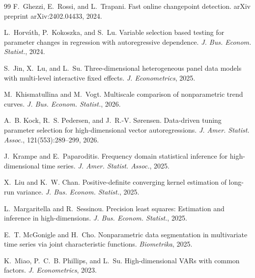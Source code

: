 \documentclass[12pt]{article}
\begin{document}
{\begin{thebibliography}{99}
F.~Ghezzi, E.~Rossi, and L.~Trapani.
\newblock Fast online changepoint detection.
\newblock arXiv preprint arXiv:2402.04433, 2024.

L.~Horv{\'a}th, P.~Kokoszka, and S.~Lu.
\newblock Variable selection based testing for parameter changes in regression with autoregressive dependence.
\newblock \emph{J. Bus. Econom. Statist.}, 2024.

S.~Jin, X.~Lu, and L.~Su.
\newblock Three-dimensional heterogeneous panel data models with multi-level interactive fixed effects.
\newblock \emph{J. Econometrics}, 2025.

M.~Khismatullina and M.~Vogt.
\newblock Multiscale comparison of nonparametric trend curves.
\newblock \emph{J. Bus. Econom. Statist.}, 2026.

A.~B. Kock, R.~S. Pedersen, and J.~R.-V. S{\o}rensen.
\newblock Data-driven tuning parameter selection for high-dimensional vector autoregressions.
\newblock \emph{J. Amer. Statist. Assoc.}, 121(553):289--299, 2026.

J.~Krampe and E.~Paparoditis.
\newblock Frequency domain statistical inference for high-dimensional time series.
\newblock \emph{J. Amer. Statist. Assoc.}, 2025.

X.~Liu and K.~W. Chan.
\newblock Positive-definite converging kernel estimation of long-run variance.
\newblock \emph{J. Bus. Econom. Statist.}, 2025.

L.~Margaritella and R.~Sessinou.
\newblock Precision least squares: Estimation and inference in high-dimensions.
\newblock \emph{J. Bus. Econom. Statist.}, 2025.

E.~T. McGonigle and H.~Cho.
\newblock Nonparametric data segmentation in multivariate time series via joint characteristic functions.
\newblock \emph{Biometrika}, 2025.

K.~Miao, P.~C.~B. Phillips, and L.~Su.
\newblock High-dimensional {VAR}s with common factors.
\newblock \emph{J. Econometrics}, 2023.


\end{thebibliography}}
\end{document}
